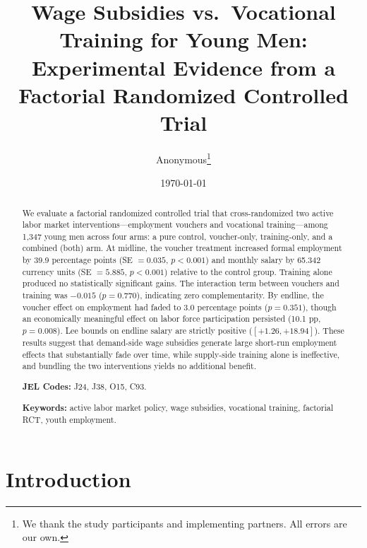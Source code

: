 \documentclass[12pt]{article}
\title{\Large \textbf{Wage Subsidies vs.\ Vocational Training for Young Men: \\
Experimental Evidence from a Factorial Randomized Controlled Trial}}
\author{
  Anonymous\thanks{%
    We thank the study participants and implementing partners.
    All errors are our own.}
}
\date{\today}
\begin{document}
\maketitle

\begin{abstract}
\noindent
We evaluate a factorial randomized controlled trial that cross-randomized two active labor market interventions---employment vouchers and vocational training---among 1,347 young men across four arms: a pure control, voucher-only, training-only, and a combined (both) arm. At midline, the voucher treatment increased formal employment by 39.9 percentage points (SE $= 0.035$, $p < 0.001$) and monthly salary by 65.342 currency units (SE $= 5.885$, $p < 0.001$) relative to the control group. Training alone produced no statistically significant gains. The interaction term between vouchers and training was $-0.015$ ($p = 0.770$), indicating zero complementarity. By endline, the voucher effect on employment had faded to 3.0 percentage points ($p = 0.351$), though an economically meaningful effect on labor force participation persisted (10.1 pp, $p = 0.008$). Lee bounds on endline salary are strictly positive ($[+1.26, +18.94]$). These results suggest that demand-side wage subsidies generate large short-run employment effects that substantially fade over time, while supply-side training alone is ineffective, and bundling the two interventions yields no additional benefit.

\medskip
\noindent \textbf{JEL Codes:} J24, J38, O15, C93.

\noindent \textbf{Keywords:} active labor market policy, wage subsidies, vocational training, factorial RCT, youth employment.
\end{abstract}

\clearpage


\section{Introduction}\label{sec:intro}
\end{document}
